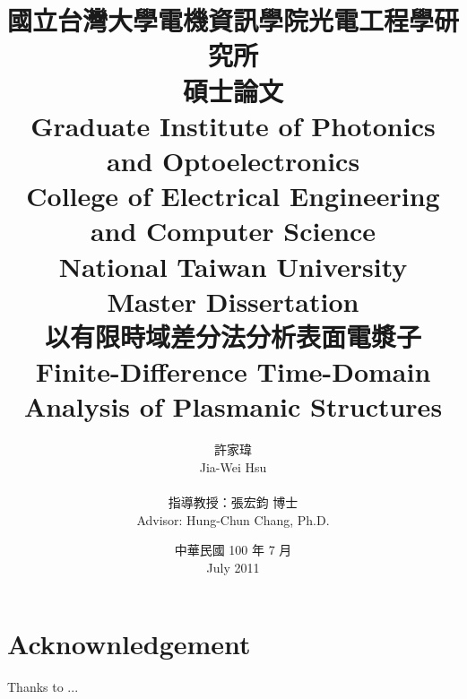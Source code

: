 \documentclass{book}
\begin{document}
\fontsize{12}{2em}\selectfont

\title{
  \kai 國立台灣大學電機資訊學院光電工程學研究所\\碩士論文\\
  \rm Graduate Institute of Photonics and Optoelectronics\\College of Electrical Engineering and Computer Science\\National Taiwan University\\Master Dissertation\\[1cm]
  \kai 以有限時域差分法分析表面電漿子\\
  \rm Finite-Difference Time-Domain Analysis of Plasmanic Structures
}
\author{
  \kai 許家瑋\\ \rm Jia-Wei Hsu\\\\
  \kai 指導教授：張宏鈞 博士\\ \rm Advisor: Hung-Chun Chang, Ph.D.
}
\date{
  \kai 中華民國 100 年 7 月\\ 
  \rm July 2011
}

\maketitle
{}



\chapter*{Acknownledgement}
Thanks to ...
\end{document}
